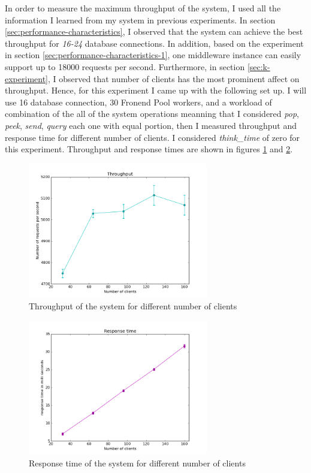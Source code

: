 \documentclass[11pt]{article}
\begin{document}
In order to measure the maximum throughput of the system, 
I used all the information I learned from my system in previous experiments.
In section \ref{sec:performance-characteristics}, I observed that the system
can achieve the best throughput for \emph{16-24} database connections. In addition,
based on the experiment in section \ref{sec:performance-characteristics-1},
one middleware instance can easily support up to 18000 requests per second. 
Furthermore, in section \ref{sec:k-experiment}, I observed that number of 
clients has the most prominent affect on throughput. Hence, for this experiment
I came up with the following set up. I will use 16 database connection, 30 Fronend
Pool workers, and a workload of combination of the all of the system operations
meanning that I considered \emph{pop}, \emph{peek}, \emph{send}, \emph{query}
each one with equal portion, then I measured  
throughput and response time for different number of clients. I considered \emph{think\_time} of zero 
for this experiment. Throughput and response times are shown in figures \ref{fig:th-th}
and \ref{fig:th-rs}.


\begin{figure}[H]
  \includegraphics[width=0.7\textwidth,page=1]{figures/max_throughput_throughput}
  \centering
  \caption{Throughput of the system for different number of clients}
  \label{fig:th-th}
\end{figure}

\begin{figure}[H]
  \includegraphics[width=0.7\textwidth,page=1]{figures/max_throughput_response_time}
  \centering
  \caption{Response time of the system for different number of clients}
  \label{fig:th-rs}
\end{figure}
\end{document}
